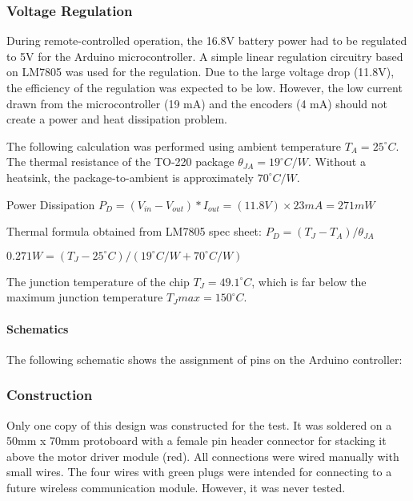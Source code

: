 \subsubsection{Voltage Regulation}
\label{subsubsection:exploration_1_voltage_regulation}

During remote-controlled operation, the 16.8V battery power had to be regulated to 5V for the Arduino microcontroller. A simple linear regulation circuitry based on LM7805 was used for the regulation. Due to the large voltage drop (11.8V), the efficiency of the regulation was expected to be low. However, the low current drawn from the microcontroller (19 mA) and the encoders (4 mA) should not create a power and heat dissipation problem.

The following calculation was performed using ambient temperature $T_A = 25^{\circ}C$. The thermal resistance of the TO-220 package $\theta_{JA} = 19^{\circ}C/W$. Without a heatsink, the package-to-ambient is approximately $70 ^{\circ}C/W$.

Power Dissipation $P_D = (V_{in} - V_{out}) * I_{out} = (11.8V) \times 23mA = 271mW$

Thermal formula obtained from LM7805 spec sheet:
$P_D = (T_J - T_A) / \theta_{JA}$

$0.271W = (T_J - 25^{\circ}C) / (19^{\circ}C/W + 70^{\circ}C/W)$

The junction temperature of the chip $T_J = 49.1^{\circ}C$, which is far below the maximum junction temperature $T_J{max} = 150^{\circ}C$.

\paragraph{Schematics}

The following schematic shows the assignment of pins on the Arduino controller:

\subsubsection{Construction}
\label{subsubsection:exploration_1_construction}

Only one copy of this design was constructed for the test. It was soldered on a 50mm x 70mm protoboard with a female pin header connector for stacking it above the motor driver module (red). All connections were wired manually with small wires. The four wires with green plugs were intended for connecting to a future wireless communication module. However, it was never tested.

